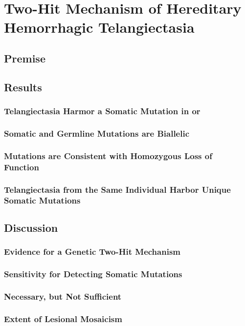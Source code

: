 \chapter{Two-Hit Mechanism of Hereditary Hemorrhagic Telangiectasia}
\label{chap:guide}

\section{Premise}

\section{Results}
\subsection{Telangiectasia Harmor a Somatic Mutation in  or }
\subsection{Somatic and Germline Mutations are Biallelic}
\subsection{Mutations are Consistent with Homozygous Loss of Function}
\subsection{Telangiectasia from the Same Individual Harbor Unique Somatic Mutations}

\section{Discussion}
\subsection{Evidence for a Genetic Two-Hit Mechanism}
\subsection{Sensitivity for Detecting Somatic Mutations}
\subsection{Necessary, but Not Sufficient}
\subsection{Extent of Lesional Mosaicism}
